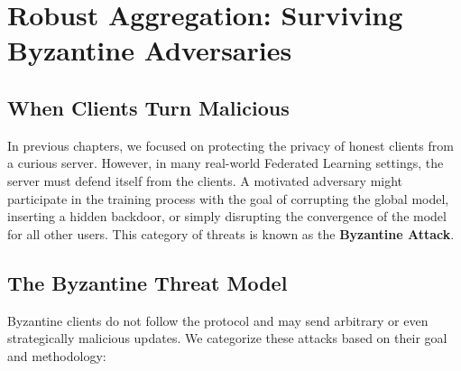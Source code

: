 
\chapter{Robust Aggregation: Surviving Byzantine Adversaries}
\label{chap:robust_aggregation}


\section{When Clients Turn Malicious}
\label{sec:malicious_clients}

In previous chapters, we focused on protecting the privacy of honest clients from a curious server. However, in many real-world Federated Learning settings, the server must defend itself from the clients. A motivated adversary might participate in the training process with the goal of corrupting the global model, inserting a hidden backdoor, or simply disrupting the convergence of the model for all other users. This category of threats is known as the \textbf{Byzantine Attack}.

\section{The Byzantine Threat Model}
\label{sec:byzantine_threat}

Byzantine clients do not follow the protocol and may send arbitrary or even strategically malicious updates. We categorize these attacks based on their goal and methodology:

